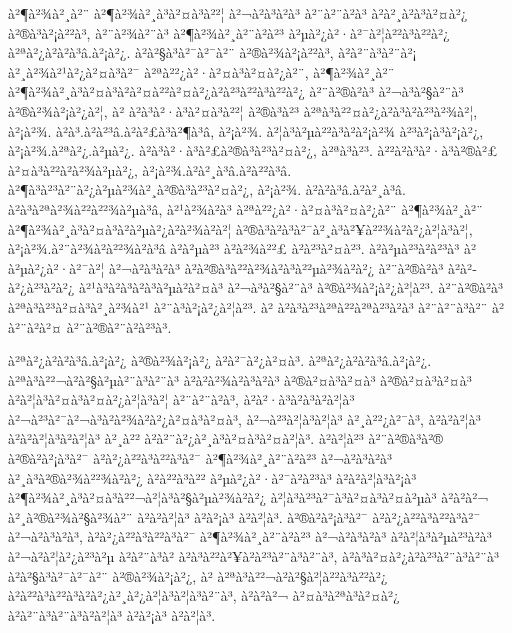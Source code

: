 à²¶à²¾à²¸à²¨ à²¶à²¾à²¸à³à²¤à³à²²¦ à²¬à²à³à²à³ à²¨à²¨à²à³ à²à²¸à²à³à²¤à²¿ à²®à³à²¡à²²à³, à²¨à²¾à²¨à³ à²¶à²¾à²¸à²¨à²à²³ à²µà²¿à²·à²¯à²¦à²²à³à²²à²¿ à²ªà²¿à²à²à³â.à²¡à²¿. à²à²§à³à²¯à²¯à²¨ à²®à²¾à²¡à²²à³, à²à²¨à³à²¨à²¡ à²¸à²¾à²¹à²¿à²¤à³à²¯ à²ªà²²¿à²·à²¤à³à²¤à²¿à²¨, à²¶à²¾à²¸à²¨ à²¶à²¾à²¸à³à²¤à³à²\circ à²¤à²²à²¤à²¿à²à²³à²²à³à²²à²¿ à²¨à²®à²à³ à²¬à³à²§à²¨à³ à²®à²¾à²¡à²¿à²¦, à² à²à³à²·à³à²¤à³à²²¦ à²®à³à²³ à²ªà³à²²¤à²¿à²­à³à²à²³à²¾à²¦, à²¡à²¾. à²à³.à²à²³â.à²à²£à³à²¶à³â, à²¡à²¾. à²¦à³à²µà²²à³à²à²¡à²¾ à²³à²¡à³à²¡à²¿, à²¡à²¾.à²ªà²¿.à²µà²¿. à²à³à²·à³à²£à²®à³à²³à²¤à²¿, à²ªà³à²³. à²²à²à³à²·à³à²®à²£ à²¤à³à²²à²à²¾à²µà²¿, à²¡à²¾.à²à²¸à³â.à²à²²à³â. à²¶à³à²³à²¨à²¿à²µà²¾à²¸à²®à³à²³à²¤à²¿, à²¡à²¾. à²à²à³â.à²à²¸à³â. à²à³à²ªà²¾à²²à²²¾à²µà³â, à²¹à²¾à²à³ à²ªà²²¿à²·à²¤à³à²¤à²¿à²¨ à²¶à²¾à²¸à²¨ à²¶à²¾à²¸à³à²¤à³à²\circ à²µà²¿à²­à²¾à²à²¦ à²®à³à²à³à²¯à²¸à³à²¥à²²¾à²à²¿à²¦à³à²¦, à²¡à²¾.à²¨à²¾à²à²²¾à²à³â à²à²µà²³ à²à²¾à²²£ à²à²³à²¤à²³. à²à²µà²³à²à²³à³ à² à²µà²¿à²·à²¯à²¦ à²¬à²à³à²à³ à²à²®à³à²²à²¾à²à³à²²µà²¾à²à²¿ à²¨à²®à²à³ à²à²­à²¿à²³à²à²¿ à²¹à³à²à³à²à³à²µà²à²¤à³ à²¬à³à²§à²¨à³ à²®à²¾à²¡à²¿à²¦à²³. à²¨à²®à²à³ à²ªà³à²³à²¤à³à²¸à²¾à²¹ à²¨à³à²¡à²¿à²¦à²³. à² à²à³à²³à²ªà²²à²ªà²³à²à³ à²¨à²¨à³à²¨ à²à²¨à²à²¤ à²¨à²®à²¨à²à²³à³. 

à²ªà²¿à²à²à³â.à²¡à²¿ à²®à²¾à²¡à²¿ à²à²¯à²¿à²¤à³. à²ªà²¿à²à²à³â.à²¡à²¿. à²ªà³à²²¬à²à²§à²µà²¨à³à²¨à³ à²à²à²¾à²à³à²à³ à²®à²¤à³à²¤à³ à²®à²¤à³à²¤à³ à²à²¦à³à²¤à³à²¤à²¿à²¦à³à²¦ à²¨à²¨à²à³, à²à²·à³à²à³à²à²¦à³ à²¬à²³à²¯à²¬à³à²à²¾à²à²¿à²¤à³à²¤à³, à²¬à²³à²¦à³à²¦à³ à²¸à²²¿à²¯à³, à²à²à²¦à³ à²à²à²¦à³à²à²¦à³ à²¸à²² à²à²¨à²¿à²¸à³à²¤à³à²¤à²¦à³. à²à²¦à²³ à²¨à²®à³à²® à²®à²à²¡à³à²¯ à²à²¿à²²à³à²²à³à²¯ à²¶à²¾à²¸à²¨à²à²³ à²¬à²à³à²à³ à²¸à³à²®à²¾à²²¾à²à²¿ à²à²²à³à²² à²µà²¿à²·à²¯à²à²³à³ à²à²à²¦à³à²¡à³ à²¶à²¾à²¸à³à²¤à³à²²¬à²¦à³à²§à²µà²¾à²à²¿ à²¦à³à²³à²¯à³à²¤à³à²¤à²µà³ à²à²à²¬ à²¸à²®à²¾à²§à²¾à²¨ à²à²à²¦à³ à²à²¡à³ à²à²¦à³. à²®à²à²¡à³à²¯ à²à²¿à²²à³à²²à³à²¯ à²¬à²à³à²à³, à²à²¿à²²à³à²²à³à²¯ à²¶à²¾à²¸à²¨à²à²³ à²¬à²à³à²à³ à²à²¦à³à²µà²³à²à³ à²¬à²à²¦à²¿à²³à²µ à²à²¨à³à² à²à³à²²à²¥à²à²³à²¨à³à²¨à³, à²à³à²¤à²¿à²à²³à²¨à³à²¨à³ à²à²§à³à²¯à²¯à²¨ à²®à²¾à²¡à²¿, à² à²ªà³à²²¬à²à²§à²¦à²²à³à²²à²¿ à²à²²à³à²²à³à²à²¿à²¸à²¿à²¦à³à²¦à³à²¨à³, à²à²à²¬ à²¤à³à²ªà³à²¤à²¿ à²à²¨à³à²¨à³à²à²¦à³ à²à²¡à³ à²à²¦à³. 

